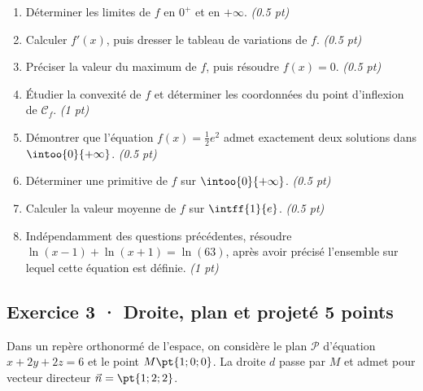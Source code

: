 \begin{enumerate}

\item Déterminer les limites de $f$ en $0^+$ et en $+\infty$. \hfill\textit{(\num{0,5} pt)}

\item Calculer $f' (x)$, puis dresser le tableau de variations de $f$. \hfill\textit{(\num{0,5} pt)}

\item Préciser la valeur du maximum de $f$, puis résoudre $f(x)=0$. \hfill\textit{(\num{0,5} pt)}

\item Étudier la convexité de $f$ et déterminer les coordonnées du point d'inflexion de $\mathcal C_f$. \hfill\textit{(1 pt)}

\item Démontrer que l'équation $f(x)=\frac12 e^{2}$ admet exactement deux solutions dans $\intoo{0}{+\infty}$. \hfill\textit{(\num{0,5} pt)}

\item Déterminer une primitive de $f$ sur $\intoo{0}{+\infty}$. \hfill\textit{(\num{0,5} pt)}

\item Calculer la valeur moyenne de $f$ sur $\intff{1}{e}$. \hfill\textit{(\num{0,5} pt)}

\item Indépendamment des questions précédentes, résoudre $\ln(x-1)+\ln(x+1)=\ln(63)$, après avoir précisé l'ensemble sur lequel cette équation est définie. \hfill\textit{(1 pt)}

\end{enumerate}

\mxnewpage{}

\subsection*{Exercice 3 · Droite, plan et projeté \hfill 5 points}Dans un repère orthonormé de l'espace, on considère le plan $\mathcal P$ d'équation $x+2y+2z=6$ et le point $M\pt{1;0;0}$. La droite $d$ passe par $M$ et admet pour vecteur directeur $\vec n=\pt{1;2;2}$.


